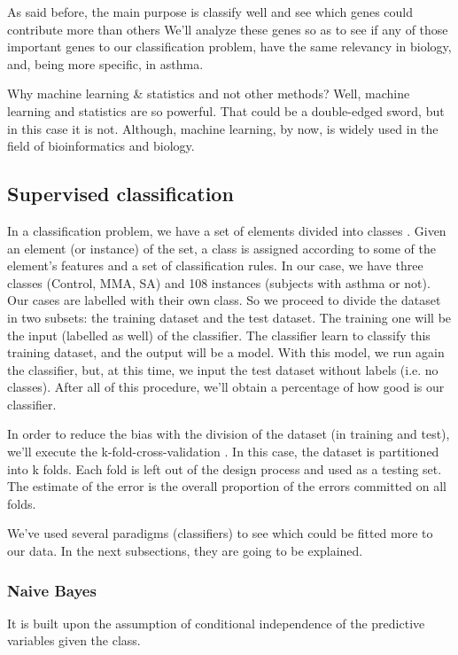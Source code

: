 \documentclass[conference,a4paper]{IEEEtran}
\begin{document}
As said before, the main purpose is classify well and see which genes could contribute more than others We'll analyze these genes so as to see if any of those important genes to our classification problem, have the same relevancy in biology, and, being more specific, in asthma.

Why machine learning \& statistics and not other methods? Well, machine learning and statistics are so powerful. That could be a double-edged sword, but in this case it is not. Although, machine learning, by now, is widely used in the field of bioinformatics and biology.

\subsection{Supervised classification}

In a classification problem, we have a set of elements divided into classes \cite{machineBioinfo}. Given an element (or instance) of the set, a class is assigned according to some of the element's features and a set of classification rules. In our case, we have three classes (Control, MMA, SA) and 108 instances (subjects with asthma or not). Our cases are labelled with their own class. So we proceed to divide the dataset in two subsets: the training dataset and the test dataset. The training one will be the input (labelled as well) of the classifier. The classifier learn to classify this training dataset, and the output will be a model. With this model, we run again the classifier, but, at this time, we input the test dataset without labels (i.e. no classes). After all of this procedure, we'll obtain a percentage of how good is our classifier.

In order to reduce the bias with the division of the dataset (in training and test), we'll execute the k-fold-cross-validation \cite{CrossValidation}. In this case, the dataset is partitioned into k folds. Each fold is left out of the design process and used as a testing set. The estimate of the error is the overall proportion of the errors committed on all folds.

We've used several paradigms (classifiers) to see which could be fitted more to our data. In the next subsections, they are going to be explained.

\subsubsection{Naive Bayes}

It is built upon the assumption of conditional independence of the predictive variables given the class. 
\end{document}
